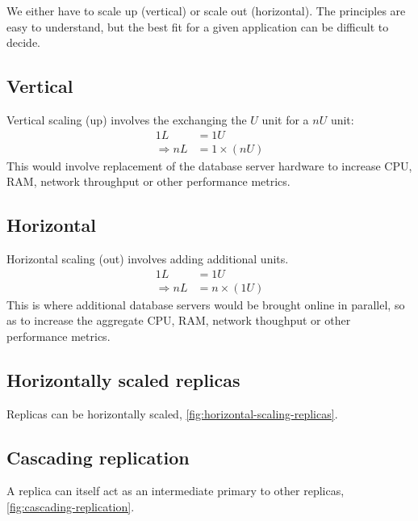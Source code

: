 \documentclass{pgnotes}
\begin{document}
We either have to scale up (vertical) or scale out (horizontal).
The principles are easy to understand, but the best fit for a given application can be difficult to decide.

\subsection{Vertical}

Vertical scaling (up) involves the exchanging the $U$ unit for a $nU$ unit:
\begin{align}
  1 L & = 1 U \\
  \Rightarrow n L & = 1 \times ( n U ) 
\end{align}
This would involve replacement of the database server hardware to increase CPU, RAM, network throughput or other performance metrics.

\subsection{Horizontal}

Horizontal scaling (out) involves adding additional units.
\begin{align}
  1 L & = 1 U \\
  \Rightarrow n L & = n \times ( 1 U ) 
\end{align}
This is where additional database servers would be brought online in parallel, so as to increase the aggregate CPU, RAM, network thoughput or other performance metrics. 

\subsection{Horizontally scaled replicas}

Replicas can be horizontally scaled, \autoref{fig:horizontal-scaling-replicas}.


\subsection{Cascading replication}

A replica can itself act as an intermediate primary to other replicas, \autoref{fig:cascading-replication}.

\end{document}
